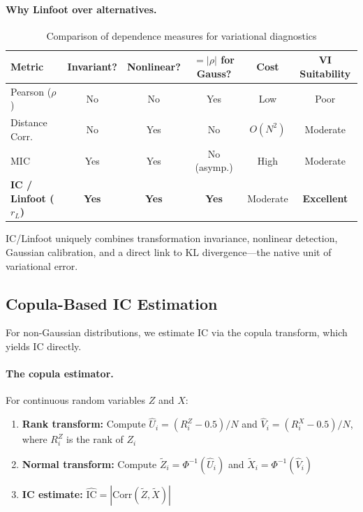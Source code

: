 \documentclass[10pt]{article} %
\theoremstyle{plain}
\theoremstyle{definition}
\newcommand{\IC}{\mathrm{IC}}  %
\begin{document}
\paragraph{Why Linfoot over alternatives.}
\begin{table}[!htbp]
\centering
\caption{Comparison of dependence measures for variational diagnostics}
\label{tab:metrics}
\small
\begin{tabular}{lccccc}
\toprule
\textbf{Metric} & \textbf{Invariant?} & \textbf{Nonlinear?} & \textbf{$= |\rho|$ for Gauss?} & \textbf{Cost} & \textbf{VI Suitability} \\
\midrule
Pearson ($\rho$) & No & No & Yes & Low & Poor \\
Distance Corr. & No & Yes & No & $O(N^2)$ & Moderate \\
MIC & Yes & Yes & No (asymp.) & High & Moderate \\
\textbf{IC / Linfoot ($r_L$)} & \textbf{Yes} & \textbf{Yes} & \textbf{Yes} & Moderate & \textbf{Excellent} \\
\bottomrule
\end{tabular}
\end{table}

\noindent IC/Linfoot uniquely combines transformation invariance, nonlinear detection, Gaussian calibration, and a direct link to KL divergence---the native unit of variational error.

\subsection{Copula-Based IC Estimation}
\label{sec:copula}

For non-Gaussian distributions, we estimate IC via the copula transform, which yields IC directly.

\paragraph{The copula estimator.} For continuous random variables $Z$ and $X$:
\begin{enumerate}[nosep]
    \item \textbf{Rank transform:} Compute $\hat{U}_i = (R_i^Z - 0.5)/N$ and $\hat{V}_i = (R_i^X - 0.5)/N$, where $R_i^Z$ is the rank of $Z_i$
    \item \textbf{Normal transform:} Compute $\tilde{Z}_i = \Phi^{-1}(\hat{U}_i)$ and $\tilde{X}_i = \Phi^{-1}(\hat{V}_i)$
    \item \textbf{IC estimate:} $\widehat{\IC} = |\text{Corr}(\tilde{Z}, \tilde{X})|$
\end{enumerate}
\end{document}
